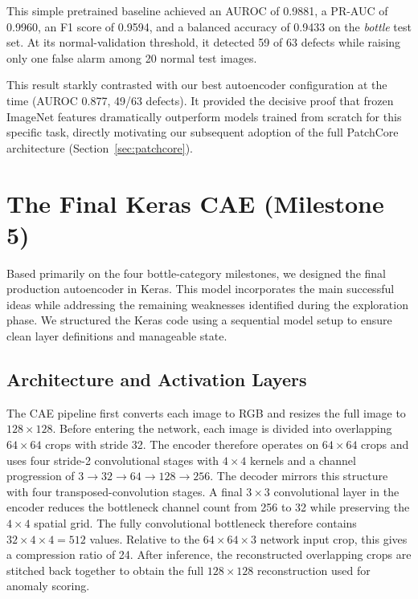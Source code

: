 \documentclass[11pt, a4paper]{article}
\begin{document}
This simple pretrained baseline achieved an AUROC of 0.9881, a PR-AUC of 0.9960, an F1 score of 0.9594, and a balanced accuracy of 0.9433 on the \textit{bottle} test set. At its normal-validation threshold, it detected 59 of 63 defects while raising only one false alarm among 20 normal test images.

This result starkly contrasted with our best autoencoder configuration at the time (AUROC 0.877, 49/63 defects). It provided the decisive proof that frozen ImageNet features dramatically outperform models trained from scratch for this specific task, directly motivating our subsequent adoption of the full PatchCore architecture (Section~\ref{sec:patchcore}).



\section{The Final Keras CAE (Milestone 5)}
\label{sec:cae}

Based primarily on the four bottle-category milestones, we designed the final production autoencoder in Keras. This model incorporates the main successful ideas while addressing the remaining weaknesses identified during the exploration phase. We structured the Keras code using a sequential model setup to ensure clean layer definitions and manageable state.

\subsection{Architecture and Activation Layers}

The CAE pipeline first converts each image to RGB and resizes the full image to $128 \times 128$. Before entering the network, each image is divided into overlapping $64 \times 64$ crops with stride 32. The encoder therefore operates on $64 \times 64$ crops and uses four stride-2 convolutional stages with $4 \times 4$ kernels and a channel progression of $3 \to 32 \to 64 \to 128 \to 256$. The decoder mirrors this structure with four transposed-convolution stages. A final $3 \times 3$ convolutional layer in the encoder reduces the bottleneck channel count from 256 to 32 while preserving the $4 \times 4$ spatial grid. The fully convolutional bottleneck therefore contains $32 \times 4 \times 4 = 512$ values. Relative to the $64 \times 64 \times 3$ network input crop, this gives a compression ratio of 24. After inference, the reconstructed overlapping crops are stitched back together to obtain the full $128 \times 128$ reconstruction used for anomaly scoring.
\end{document}
